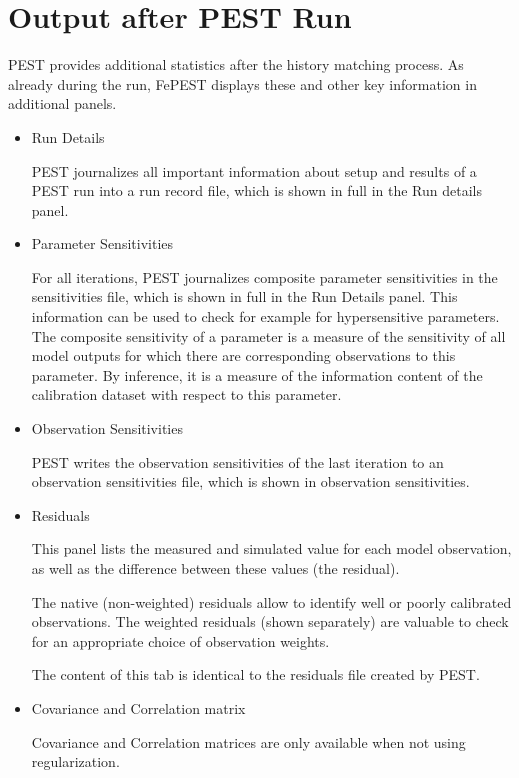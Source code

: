 \section{Output after PEST Run}

PEST provides additional statistics after the history matching process. As already during the run, FePEST displays these and other key information in additional panels.

\begin{itemize}

\item	Run Details

PEST journalizes all important information about setup and results of a PEST run into a run record file, which is shown in full in the Run details panel.

\item	Parameter Sensitivities

For all iterations, PEST journalizes composite parameter sensitivities in the sensitivities file, which is shown in full in the Run Details panel. This information can be used to check for example for hypersensitive parameters. The composite sensitivity of a parameter is a measure of the sensitivity of all model outputs for which there are corresponding observations to this parameter. By inference, it is a measure of the information content of the calibration dataset with respect to this parameter.

\item	Observation Sensitivities

PEST writes the observation sensitivities of the last iteration to an observation sensitivities file, which is shown in observation sensitivities.

\item	Residuals

This panel lists the measured and simulated value for each model observation, as well as the difference between these values (the residual). 

The native (non-weighted) residuals allow to identify well or poorly calibrated observations. The weighted residuals (shown separately) are valuable to check for an appropriate choice of observation weights.

The content of this tab is identical to the residuals file created by PEST.

\item	Covariance and Correlation matrix

Covariance and Correlation matrices are only available when not using regularization.


\end{itemize}
